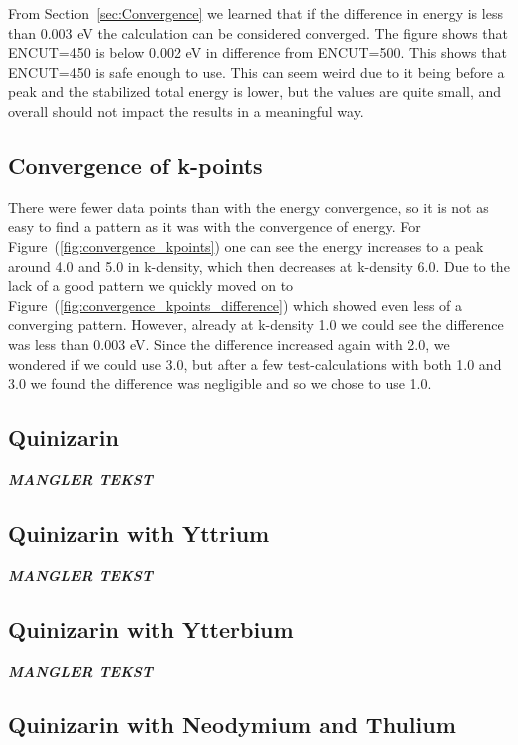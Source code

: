 \documentclass{article}
\begin{document}
    From Section~\ref{sec:Convergence} we learned that if the difference in energy is less than 0.003 eV the calculation can be considered converged. The figure shows that ENCUT=450 is below 0.002 eV in difference from ENCUT=500. This shows that ENCUT=450 is safe enough to use. This can seem weird due to it being before a peak and the stabilized total energy is lower, but the values are quite small, and overall should not impact the results in a meaningful way. \\

  \subsection{Convergence of k-points}

    There were fewer data points than with the energy convergence, so it is not as easy to find a pattern as it was with the convergence of energy. For Figure~(\ref{fig:convergence_kpoints}) one can see the energy increases to a peak around 4.0 and 5.0 in k-density, which then decreases at k-density 6.0. Due to the lack of a good pattern we quickly moved on to Figure~(\ref{fig:convergence_kpoints_difference}) which showed even less of a converging pattern. However, already at k-density 1.0 we could see the difference was less than 0.003 eV. Since the difference increased again with 2.0, we wondered if we could use 3.0, but after a few test-calculations with both 1.0 and 3.0 we found the difference was negligible and so we chose to use 1.0. \\


  \subsection{Quinizarin}

    \textbf{\textit{MANGLER TEKST}}


  \subsection{Quinizarin with Yttrium}

    \textbf{\textit{MANGLER TEKST}}


  \subsection{Quinizarin with Ytterbium}

    \textbf{\textit{MANGLER TEKST}}


  \subsection{Quinizarin with Neodymium and Thulium}
\end{document}
